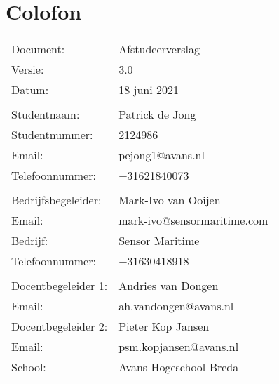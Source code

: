 \chapter*{Colofon}
\begin{table}[h!]
	\begin{tabular}{p{5cm}l}
	Document:           & Afstudeerverslag            \\
	Versie:             & 3.0                         \\
	Datum:              & 18 juni 2021               \\
						&                             \\
	Studentnaam:        & Patrick de Jong             \\
	Studentnummer:      & 2124986                     \\
	Email:              & pejong1@avans.nl            \\
	Telefoonnummer:     & +31621840073                \\
						&                             \\
	Bedrijfsbegeleider: & Mark-Ivo van Ooijen         \\
	Email:              & mark-ivo@sensormaritime.com \\
	Bedrijf:            & Sensor Maritime             \\
	Telefoonnummer:     & +31630418918                \\
						&                             \\
	Docentbegeleider 1: & Andries van Dongen          \\
	Email:              & ah.vandongen@avans.nl       \\
	Docentbegeleider 2: & Pieter Kop Jansen           \\
	Email:              & psm.kopjansen@avans.nl      \\
	School:             & Avans Hogeschool Breda     
	\end{tabular}
\end{table}